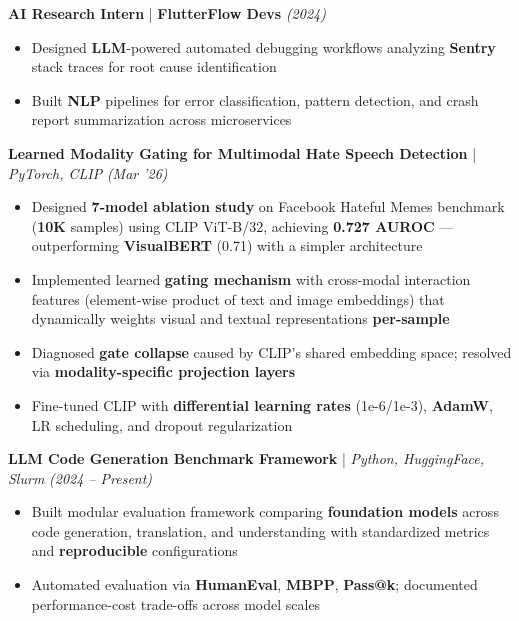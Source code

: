 \documentclass[10pt]{article}
\newcommand{\xfill}[2][1ex]{
    \dimen0=#2\advance\dimen0 by #1
    \leaders\hrule height \dimen0 depth -#1\hfill
}
\renewcommand{\section}[1]{
    \vspace{3pt}
    {\color{RoyalBlue}{\normalsize\scshape\raggedright #1\xfill[0pt]{0.5pt}}}
    \vspace{1pt}
}
\newcommand{\filldate}[1]{\hfill {\small \textit{(#1)}}}
\begin{document}
\vspace{2pt}
\textbf{AI Research Intern} | \textbf{FlutterFlow Devs} \filldate{2024}
\begin{itemize}
\hrule \vspace{1pt}
    \item Designed \textbf{LLM}-powered automated debugging workflows analyzing \textbf{Sentry} stack traces for root cause identification
    \item Built \textbf{NLP} pipelines for error classification, pattern detection, and crash report summarization across microservices
\end{itemize}

\section{Research Projects}

\vspace{1pt}
\textbf{Learned Modality Gating for Multimodal Hate Speech Detection} | \textit{PyTorch, CLIP} \filldate{Mar '26}
\begin{itemize}
\hrule \vspace{1pt}
    \item Designed \textbf{7-model ablation study} on Facebook Hateful Memes benchmark (\textbf{10K} samples) using CLIP ViT-B/32, achieving \textbf{0.727 AUROC} --- outperforming \textbf{VisualBERT} (0.71) with a simpler architecture
    \item Implemented learned \textbf{gating mechanism} with cross-modal interaction features (element-wise product of text and image embeddings) that dynamically weights visual and textual representations \textbf{per-sample}
    \item Diagnosed \textbf{gate collapse} caused by CLIP's shared embedding space; resolved via \textbf{modality-specific projection layers}
    \item Fine-tuned CLIP with \textbf{differential learning rates} (1e-6/1e-3), \textbf{AdamW}, LR scheduling, and dropout regularization
\end{itemize}

\vspace{2pt}
\textbf{LLM Code Generation Benchmark Framework} | \textit{Python, HuggingFace, Slurm} \filldate{2024 -- Present}
\begin{itemize}
\hrule \vspace{1pt}
    \item Built modular evaluation framework comparing \textbf{foundation models} across code generation, translation, and understanding with standardized metrics and \textbf{reproducible} configurations
    \item Automated evaluation via \textbf{HumanEval}, \textbf{MBPP}, \textbf{Pass@k}; documented performance-cost trade-offs across model scales
\end{itemize}
\end{document}
